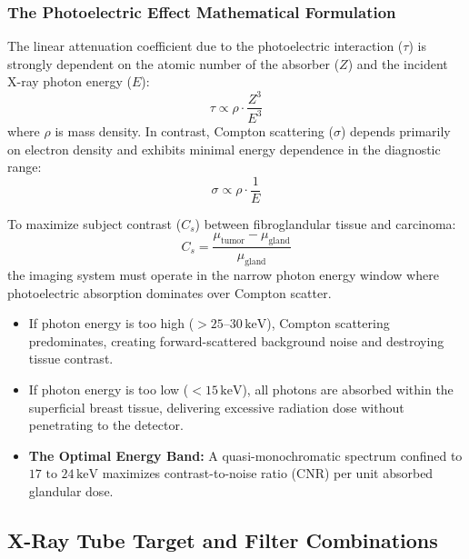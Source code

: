\documentclass[11pt,a4paper]{article}
\begin{document}
\subsubsection{The Photoelectric Effect Mathematical Formulation}
The linear attenuation coefficient due to the photoelectric interaction ($\tau$) is strongly dependent on the atomic number of the absorber ($Z$) and the incident X-ray photon energy ($E$):
\begin{equation}
    \tau \propto \rho \cdot \frac{Z^3}{E^3}
\end{equation}
where $\rho$ is mass density. In contrast, Compton scattering ($\sigma$) depends primarily on electron density and exhibits minimal energy dependence in the diagnostic range:
\begin{equation}
    \sigma \propto \rho \cdot \frac{1}{E}
\end{equation}

\begin{radiationphysics}
To maximize subject contrast ($C_s$) between fibroglandular tissue and carcinoma:
\begin{equation}
    C_s = \frac{\mu_{\text{tumor}} - \mu_{\text{gland}}}{\mu_{\text{gland}}}
\end{equation}
the imaging system must operate in the narrow photon energy window where photoelectric absorption dominates over Compton scatter. 
\begin{itemize}[leftmargin=*]
    \item If photon energy is too high ($> 25\text{--}30\,\text{keV}$), Compton scattering predominates, creating forward-scattered background noise and destroying tissue contrast.
    \item If photon energy is too low ($< 15\,\text{keV}$), all photons are absorbed within the superficial breast tissue, delivering excessive radiation dose without penetrating to the detector.
    \item \textbf{The Optimal Energy Band:} A quasi-monochromatic spectrum confined to \textbf{$17\text{ to }24\,\text{keV}$} maximizes contrast-to-noise ratio (CNR) per unit absorbed glandular dose.
\end{itemize}
\end{radiationphysics}

\subsection{X-Ray Tube Target and Filter Combinations}
\end{document}
